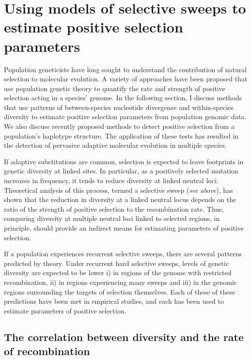 \section[Using models of selective sweeps to estimate positive selection parameters]{Using models of selective sweeps to estimate positive selection parameters}
 
Population geneticists have long sought to understand the contribution of natural selection to molecular evolution. A variety of approaches have been proposed that use population genetic theory to quantify the rate and strength of positive selection acting in a species’ genome. In the following section, I discuss methods that use patterns of between-species nucleotide divergence and within-species diversity to estimate positive selection parameters from population genomic data. We also discuss recently proposed methods to detect positive selection from a population’s haplotype structure. The application of these tests has resulted in the detection of pervasive adaptive molecular evolution in multiple species.
 
If adaptive substitutions are common, selection is expected to leave footprints in genetic diversity at linked sites. In particular, as a positively selected mutation increases in frequency, it tends to reduce diversity at linked neutral loci. Theoretical analysis of this process, termed a selective sweep (\textit{see above}), has shown that the reduction in diversity at a linked neutral locus depends on the ratio of the strength of positive selection to the recombination rate. Thus, comparing diversity at multiple neutral loci linked to selected regions, in principle, should provide an indirect means for estimating parameters of positive selection.

If a population experiences recurrent selective sweeps, there are several patterns predicted by theory. Under recurrent hard selective sweeps, levels of genetic diversity are expected to be lower i) in regions of the genome with restricted recombination, ii) in regions experiencing many sweeps and iii) in the genomic regions surrounding the targets of selection themselves. Each of these of these predictions have been met in empirical studies, and each has been used to estimate parameters of positive selection.

\subsection[The correlation between diversity and the rate of recombination]{The correlation between diversity and the rate of recombination}

